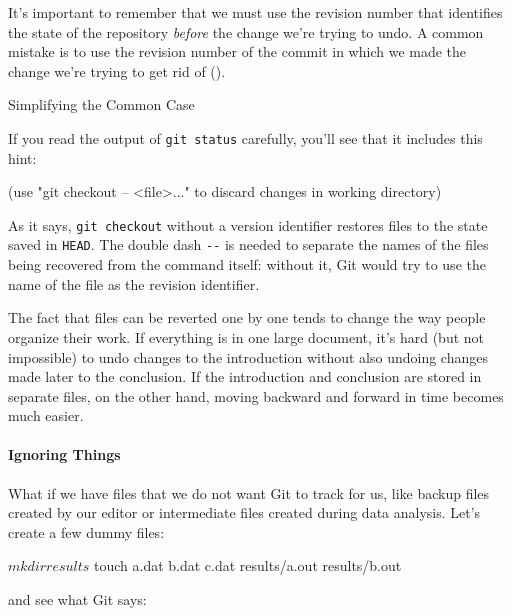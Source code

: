 \documentclass{book}
\begin{document}
It's important to remember that we must use the revision number that
identifies the state of the repository \emph{before} the change we're
trying to undo. A common mistake is to use the revision number of the
commit in which we made the change we're trying to get rid of ().


\begin{swcbox}{Simplifying the Common Case}

If you read the output of \texttt{git status} carefully, you'll see that
it includes this hint:

\begin{VerbOut}
(use "git checkout -- <file>..." to discard changes in working directory)
\end{VerbOut}

As it says, \texttt{git checkout} without a version identifier restores
files to the state saved in \texttt{HEAD}. The double dash \texttt{-{}-}
is needed to separate the names of the files being recovered from the
command itself: without it, Git would try to use the name of the file as
the revision identifier.

\end{swcbox}

The fact that files can be reverted one by one tends to change the way
people organize their work. If everything is in one large document, it's
hard (but not impossible) to undo changes to the introduction without
also undoing changes made later to the conclusion. If the introduction
and conclusion are stored in separate files, on the other hand, moving
backward and forward in time becomes much easier.

\mbox{}\paragraph{Ignoring Things}

What if we have files that we do not want Git to track for us, like
backup files created by our editor or intermediate files created during
data analysis. Let's create a few dummy files:

\begin{VerbIn}
$ mkdir results
$ touch a.dat b.dat c.dat results/a.out results/b.out
\end{VerbIn}

and see what Git says:
\end{document}
